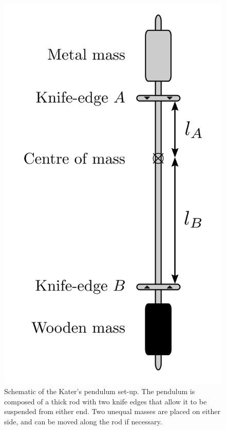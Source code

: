  \begin{figure}[!htb]
        \centering
        \includegraphics[scale=0.4]{figs/katers-pendulum/katers-setup.png}
        \caption{Schematic of the Kater's pendulum set-up. The pendulum is composed of a thick rod with two knife edges that allow it to be suspended from either end. Two unequal masses are placed on either side, and can be moved along the rod if necessary.}
        \label{fig:katers-setup}
\end{figure}

